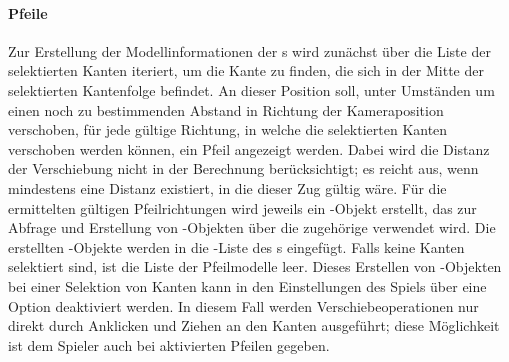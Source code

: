 \paragraph{Pfeile}

Zur Erstellung der Modellinformationen der s wird zunächst über die Liste der selektierten Kanten iteriert, um die Kante zu finden, die sich in der Mitte der selektierten Kantenfolge befindet. An dieser Position soll, unter Umständen um einen noch zu bestimmenden Abstand in Richtung der Kameraposition verschoben, für jede gültige Richtung, in welche die selektierten Kanten verschoben werden können, ein Pfeil angezeigt werden. Dabei wird die Distanz der Verschiebung nicht in der Berechnung berücksichtigt; es reicht aus, wenn mindestens eine Distanz existiert, in die dieser Zug gültig wäre.
\newline\newline
Für die ermittelten gültigen Pfeilrichtungen wird jeweils ein -Objekt erstellt, das zur Abfrage und Erstellung von -Objekten über die zugehörige  verwendet wird. Die erstellten -Objekte werden in die -Liste des s eingefügt. Falls keine Kanten selektiert sind, ist die Liste der Pfeilmodelle leer.
\newline\newline
Dieses Erstellen von -Objekten bei einer Selektion von Kanten kann in den Einstellungen des Spiels über eine Option deaktiviert werden. In diesem Fall werden Verschiebeoperationen nur direkt durch Anklicken und Ziehen an den Kanten ausgeführt; diese Möglichkeit ist dem Spieler auch bei aktivierten Pfeilen gegeben.

